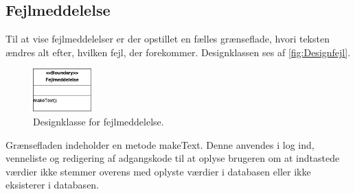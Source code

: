 \subsection*{Fejlmeddelelse}
Til at vise fejlmeddelelser er der opstillet en fælles grænseflade, hvori teksten ændres alt efter, hvilken fejl, der forekommer. Designklassen ses af \autoref{fig:Designfejl}.

\begin{figure} [H]
\centering
\includegraphics[width=0.2\textwidth]{figures/MVC/MVCfejl}
\caption{Designklasse for fejlmeddelelse.}
\label{fig:Designfejl}
\end{figure}

\noindent
Grænsefladen indeholder en metode makeText. Denne anvendes i log ind, venneliste og redigering af adgangskode til at oplyse brugeren om at indtastede værdier ikke stemmer overens med oplyste værdier i databasen eller ikke eksisterer i databasen. 